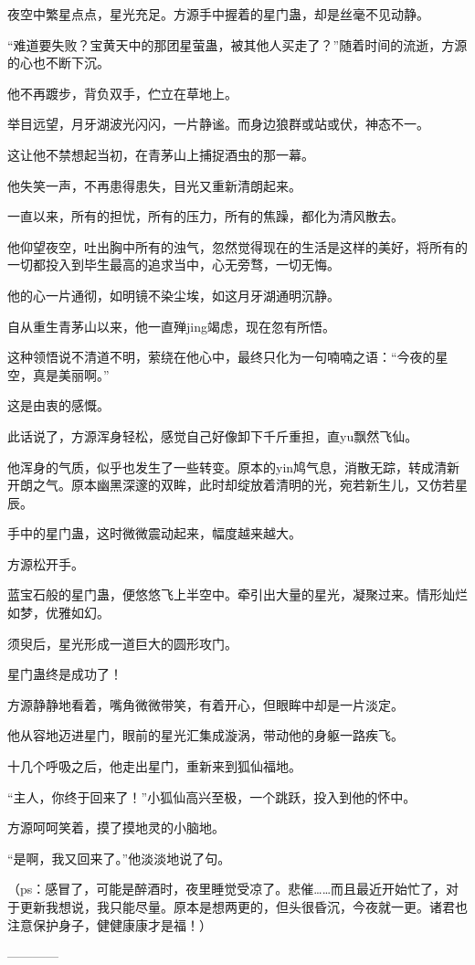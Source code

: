 \begin{this_body}
夜空中繁星点点，星光充足。方源手中握着的星门蛊，却是丝毫不见动静。

“难道要失败？宝黄天中的那团星萤蛊，被其他人买走了？”随着时间的流逝，方源的心也不断下沉。

他不再踱步，背负双手，伫立在草地上。

举目远望，月牙湖波光闪闪，一片静谧。而身边狼群或站或伏，神态不一。

这让他不禁想起当初，在青茅山上捕捉酒虫的那一幕。

他失笑一声，不再患得患失，目光又重新清朗起来。

一直以来，所有的担忧，所有的压力，所有的焦躁，都化为清风散去。

他仰望夜空，吐出胸中所有的浊气，忽然觉得现在的生活是这样的美好，将所有的一切都投入到毕生最高的追求当中，心无旁骛，一切无悔。

他的心一片通彻，如明镜不染尘埃，如这月牙湖通明沉静。

自从重生青茅山以来，他一直殚jing竭虑，现在忽有所悟。

这种领悟说不清道不明，萦绕在他心中，最终只化为一句喃喃之语：“今夜的星空，真是美丽啊。”

这是由衷的感慨。

此话说了，方源浑身轻松，感觉自己好像卸下千斤重担，直yu飘然飞仙。

他浑身的气质，似乎也发生了一些转变。原本的yin鸠气息，消散无踪，转成清新开朗之气。原本幽黑深邃的双眸，此时却绽放着清明的光，宛若新生儿，又仿若星辰。

手中的星门蛊，这时微微震动起来，幅度越来越大。

方源松开手。

蓝宝石般的星门蛊，便悠悠飞上半空中。牵引出大量的星光，凝聚过来。情形灿烂如梦，优雅如幻。

须臾后，星光形成一道巨大的圆形攻门。

星门蛊终是成功了！

方源静静地看着，嘴角微微带笑，有着开心，但眼眸中却是一片淡定。

他从容地迈进星门，眼前的星光汇集成漩涡，带动他的身躯一路疾飞。

十几个呼吸之后，他走出星门，重新来到狐仙福地。

“主人，你终于回来了！”小狐仙高兴至极，一个跳跃，投入到他的怀中。

方源呵呵笑着，摸了摸地灵的小脑地。

“是啊，我又回来了。”他淡淡地说了句。

（ps：感冒了，可能是醉酒时，夜里睡觉受凉了。悲催……而且最近开始忙了，对于更新我想说，我只能尽量。原本是想两更的，但头很昏沉，今夜就一更。诸君也注意保护身子，健健康康才是福！）

------------

\end{this_body}

